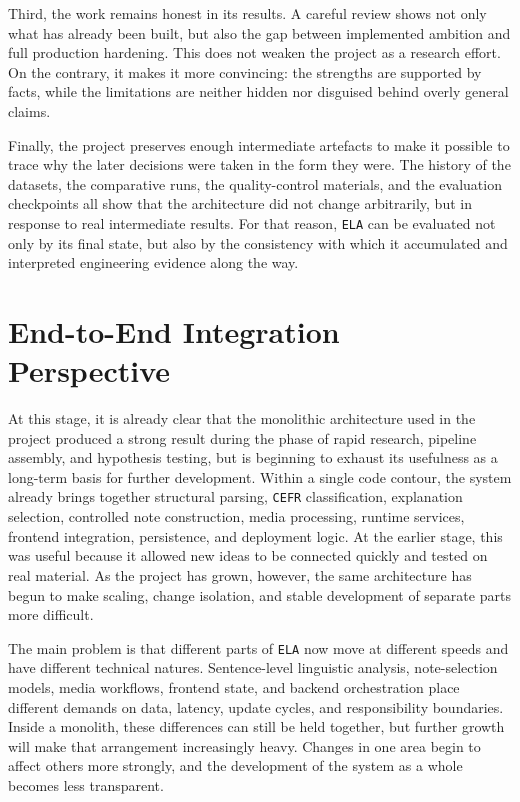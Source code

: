\documentclass[12pt,a4paper,oneside]{report}
\begin{document}
Third, the work remains honest in its results. A careful review shows not only what has already been built, but also the gap between implemented ambition and full production hardening. This does not weaken the project as a research effort. On the contrary, it makes it more convincing: the strengths are supported by facts, while the limitations are neither hidden nor disguised behind overly general claims.

Finally, the project preserves enough intermediate artefacts to make it possible to trace why the later decisions were taken in the form they were. The history of the datasets, the comparative runs, the quality-control materials, and the evaluation checkpoints all show that the architecture did not change arbitrarily, but in response to real intermediate results. For that reason, \texttt{ELA} can be evaluated not only by its final state, but also by the consistency with which it accumulated and interpreted engineering evidence along the way.

\section{End-to-End Integration Perspective}
At this stage, it is already clear that the monolithic architecture used in the project produced a strong result during the phase of rapid research, pipeline assembly, and hypothesis testing, but is beginning to exhaust its usefulness as a long-term basis for further development. Within a single code contour, the system already brings together structural parsing, \texttt{CEFR} classification, explanation selection, controlled note construction, media processing, runtime services, frontend integration, persistence, and deployment logic. At the earlier stage, this was useful because it allowed new ideas to be connected quickly and tested on real material. As the project has grown, however, the same architecture has begun to make scaling, change isolation, and stable development of separate parts more difficult.

The main problem is that different parts of \texttt{ELA} now move at different speeds and have different technical natures. Sentence-level linguistic analysis, note-selection models, media workflows, frontend state, and backend orchestration place different demands on data, latency, update cycles, and responsibility boundaries. Inside a monolith, these differences can still be held together, but further growth will make that arrangement increasingly heavy. Changes in one area begin to affect others more strongly, and the development of the system as a whole becomes less transparent.
\end{document}

